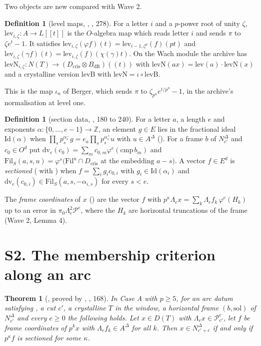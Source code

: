 \documentclass[11pt]{article}
\newcommand{\NN}{N^{\Delta}}
\newcommand{\Pp}{\mathcal P}
\newcommand{\Fil}{\mathrm{Fil}}
\newtheorem{thm}[lemma]{Theorem}
\theoremstyle{definition}
\newtheorem{defn}[lemma]{Definition}
\theoremstyle{remark}
\begin{document}
Two objects are new compared with Wave 2.

\begin{defn}[level maps, , , 278]
For a letter $i$ and a $p$-power root of unity $\zeta$, $\mathrm{lev}_{i,\zeta}\colon A\to L[[t]]$ is the $O$-algebra map which reads letter $i$ and sends $\pi$ to $\zeta e^{t}-1$. It satisfies $\mathrm{lev}_{i,\zeta}(\varphi f)(t)=\mathrm{lev}_{i-1,\zeta^p}(f)(pt)$ and $\mathrm{lev}_{i,\zeta}(\gamma f)(t)=\mathrm{lev}_{i,\zeta}(f)(\chi(\gamma)t)$. On the Wach module the archive has $\mathrm{levN}_{i,\zeta}\colon N(T)\to (D_{\mathrm{cris}}\otimes B_{\mathrm{dR}})((t))$ with $\mathrm{levN}(ax)=\mathrm{lev}(a)\cdot\mathrm{levN}(x)$ and a crystalline version $\mathrm{levB}$ with $\mathrm{levN}=\iota\circ\mathrm{levB}$.
\end{defn}

This is the map $\iota_n$ of Berger, which sends $\pi$ to $\zeta_{p^n}e^{t/p^n}-1$, in the archive's normalisation at level one.

\begin{defn}[section data, , 180 to 240]
For a letter $a$, a length $e$ and exponents $\alpha\colon\{0,\dots,e-1\}\to\mathbb Z$, an element $g\in E$ lies in the fractional ideal $\mathrm{Id}(\alpha)$ when $\prod_sp_s^{\alpha_s^-}g=e_a\prod_sp_s^{\alpha_s^+}u$ with $u\in A^\Delta$ (). For a frame $b$ of $\NN_{c'}$ and $c_0\in O^d$ put $\mathrm{dv}_e(c_0)=\sum_mc_{0,m}\varphi^e(\mathrm{cmp}\,b_m)$ and $\Fil_S(a,s,u)=\varphi^s\bigl(\Fil^u\cap D_{\mathrm{cris}}\text{ at the embedding }a-s\bigr)$. A vector $f\in E^d$ is \emph{sectioned} ( with ) when $f=\sum_ig_ic_{0,i}$ with $g_i\in\mathrm{Id}(\alpha_i)$ and $\mathrm{dv}_e(c_{0,i})\in\Fil_S(a,s,-\alpha_{i,s})$ for every $s<e$.
\end{defn}

The \emph{frame coordinates} of $x$ () are the vector $f$ with $p^{\kappa}\Lambda_ex=\sum_k\Lambda_ef_k\,\varphi^e(H_k)$ up to an error in $\pi_0\Lambda_e^2\Pp^e$, where the $H_k$ are horizontal truncations of the frame (Wave 2, Lemma 4).

\section{S2. The membership criterion along an arc}\label{sec:secCrit}

\begin{thm}[, proved by , , 168]\label{thm:secCrit}
In Case A with $p\ge5$, for an arc datum satisfying , a cut $c'$, a crystalline $T$ in the window, a horizontal frame $(b,\mathrm{sol})$ of $\NN_{c'}$ and every $e\ge0$ the following holds. Let $x\in D(T)$ with $\Lambda_ex\in\Pp^e_{c'}$, let $f$ be frame coordinates of $p^kx$ with $\Lambda_ef_k\in A^\Delta$ for all $k$. Then $x\in\NN_{c'+e}$ if and only if $p^\kappa f$ is sectioned for some $\kappa$.
\end{thm}
\end{document}
